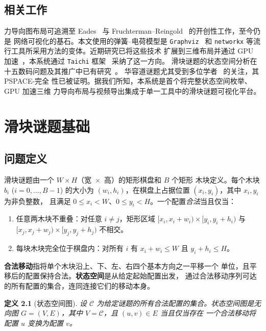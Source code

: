 \documentclass[11pt,a4paper]{report}
\newtheorem{definition}{定义}[chapter]
\begin{document}
\section{相关工作}
\label{sec:related}
力导向图布局可追溯至 Eades~\cite{eades1984heuristic} 与
Fruchterman--Reingold~\cite{fruchterman1991graph} 的开创性工作，至今仍是
网络可视化的基石。本文使用的弹簧--电荷模型是 \texttt{Graphviz}~\cite{ellson2001graphviz}
和 \texttt{networkx} 等流行工具所采用方法的变体。近期研究已将这些技术
扩展到三维布局并通过 GPU 加速~\cite{liu2014gpu}，本系统通过
\texttt{Taichi} 框架~\cite{hu2019taichi} 采纳了这一方向。
滑块谜题的状态空间分析在十五数码问题及其推广中已有研究~\cite{ratner1986finding}。
华容道谜题尤其受到多位学者~\cite{hearn2006slides} 的关注，其 PSPACE-完全
性已被证明。据我们所知，本系统是首个将完整状态空间枚举、GPU 加速三维
力导向布局与视频导出集成于单一工具中的滑块谜题可视化平台。
\chapter{滑块谜题基础}
\label{ch:puzzle}
\section{问题定义}
\label{sec:problem-def}
滑块谜题由一个 $W \times H$（宽~$\times$~高）的矩形棋盘和 $B$ 个矩形
木块定义。每个木块 $b_i$ ($i = 0, \ldots, B-1$) 的大小为
$(w_i, h_i)$，在棋盘上占据位置 $(x_i, y_i)$，其中 $x_i, y_i$ 为非负整数，
且满足 $0 \le x_i < W$、$0 \le y_i < H$。一个配置\emph{合法}当且仅当：
\begin{enumerate}
    \item 任意两木块不重叠：对任意 $i \neq j$，矩形区域
          $[x_i, x_i + w_i) \times [y_i, y_i + h_i)$ 与
          $[x_j, x_j + w_j) \times [y_j, y_j + h_j)$ 不相交。
    \item 每块木块完全位于棋盘内：对所有 $i$ 有
          $x_i + w_i \le W$ 且 $y_i + h_i \le H$。
\end{enumerate}
\textbf{合法移动}指将单个木块沿上、下、左、右四个基本方向之一平移一个
单位，且平移后的配置保持合法。\textbf{状态空间}是从给定起始配置出发，
通过合法移动序列可达的所有配置的集合，连同连接它们的移动本身。
\begin{definition}[状态空间图]
设 $\mathcal{C}$ 为给定谜题的所有合法配置的集合。状态空间图是无向图
$G = (V, E)$，其中 $V = \mathcal{C}$，且 $(u, v) \in E$ 当且仅当存在
一个合法移动将配置 $u$ 变换为配置 $v$。
\end{definition}
\end{document}
